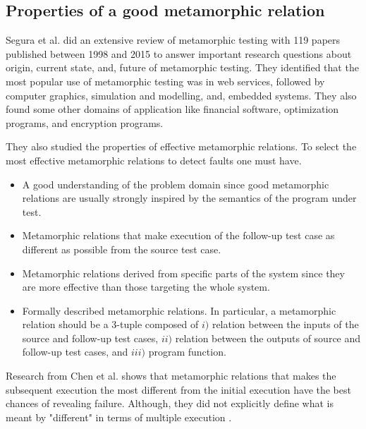\subsection{Properties of a good metamorphic relation}
Segura et al. \cite{Segura2016} did an extensive review of metamorphic testing with 119 papers published between 1998 and 2015 to answer important research questions about origin, current state, and, future of metamorphic testing. They identified that the most popular use of metamorphic testing was in web services, followed by computer graphics, simulation and modelling, and, embedded systems. They also found some other domains of application like financial software, optimization programs, and encryption programs.
 
They also studied the properties of effective metamorphic relations. To select the most effective metamorphic relations to detect faults one must have.
\begin{itemize}
	\item A good understanding of the problem domain since good metamorphic relations are usually strongly inspired by the semantics of the program under test.
	\item Metamorphic relations that make execution of the follow-up test case as different as possible from the source test case.
	\item Metamorphic relations derived from specific parts of the system since they are more effective than those targeting the whole system.
	\item Formally described metamorphic relations. In particular, a metamorphic relation should be a 3-tuple composed of $i)$ relation between the inputs of the source and follow-up test cases, $ii)$ relation between the outputs of source and follow-up test cases, and $iii)$ program function.
\end{itemize}
Research from Chen et al. shows that metamorphic relations that makes the subsequent execution the most different from the initial execution have the best chances of revealing failure. Although, they did not explicitly define what is meant by "different" in terms of multiple execution \cite{Chen2003}.

